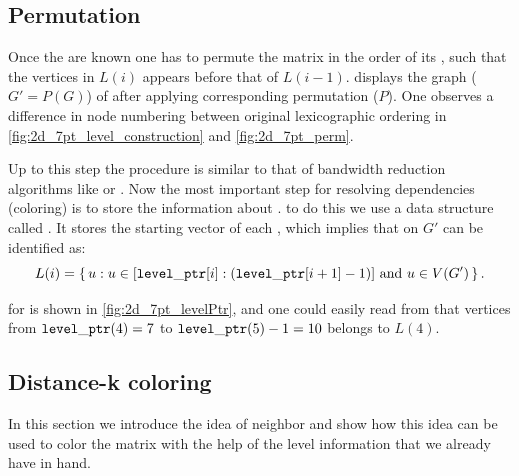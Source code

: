 \subsection{Permutation}\label{subsec:PERM}
Once the \levels are known one has to permute the matrix in the order of its \levels, such that the vertices in $L(i)$ appears before that of $L(i-1)$.   displays the graph ($G' = P(G)$) of \stex after applying corresponding permutation ($P$). One observes a difference in node numbering between original lexicographic ordering in \cref{fig:2d_7pt_level_construction} and \cref{fig:2d_7pt_perm}. 

Up to this step the procedure is similar to that of bandwidth reduction algorithms like \BFS or \RCM. Now the most important step for resolving dependencies (coloring) is to store the information about \levels. \Inorder to do this we use a data structure called \levelPtr. It stores the starting vector of each \levels, which implies that \levels on $G'$ can be identified as:
\begin{equation*}
	L(i) = \set{ u : u \in [{\tt level\_ptr} [i]:({\tt level\_ptr} [i+1]-1)] \text{ and } u \in V(G')} .
\end{equation*}

 \levelPtr for \stex is shown in \cref{fig:2d_7pt_levelPtr}, and one could easily read from \levelPtr that vertices from ${\tt level\_ptr}(4)=7$ to ${\tt level\_ptr}(5)-1=10$ belongs to $L(4)$.
 
 
 \subsection{Distance-k coloring} \label{subsec:DK}
In this section we introduce the idea of \DK neighbor and show how this idea can be used to color the matrix with the help of the level information that we already have in hand.

